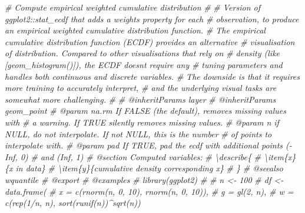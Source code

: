 \documentclass[
]{article}
\newenvironment{Shaded}{\begin{snugshade}}{\end{snugshade}}
\newcommand{\CommentTok}[1]{\textcolor[rgb]{0.56,0.35,0.01}{\textit{#1}}}
\begin{document}
\begin{Shaded}
\begin{Highlighting}[]
\CommentTok{\#\textquotesingle{} Compute empirical weighted cumulative distribution}
\CommentTok{\#\textquotesingle{}}
\CommentTok{\#\textquotesingle{} Version of \textasciigrave{}ggplot2::stat\_ecdf\textasciigrave{} that adds a \textasciigrave{}weights\textasciigrave{} property for each}
\CommentTok{\#\textquotesingle{} observation, to produce an empirical weighted cumulative distribution function.}
\CommentTok{\#\textquotesingle{} The empirical cumulative distribution function (ECDF) provides an alternative}
\CommentTok{\#\textquotesingle{} visualisation of distribution. Compared to other visualisations that rely on}
\CommentTok{\#\textquotesingle{} density (like [geom\_histogram()]), the ECDF doesn\textquotesingle{}t require any}
\CommentTok{\#\textquotesingle{} tuning parameters and handles both continuous and discrete variables.}
\CommentTok{\#\textquotesingle{} The downside is that it requires more training to accurately interpret,}
\CommentTok{\#\textquotesingle{} and the underlying visual tasks are somewhat more challenging.}
\CommentTok{\#\textquotesingle{}}
\CommentTok{\# @inheritParams layer}
\CommentTok{\# @inheritParams geom\_point}
\CommentTok{\#\textquotesingle{} @param na.rm If \textasciigrave{}FALSE\textasciigrave{} (the default), removes missing values with}
\CommentTok{\#\textquotesingle{}    a warning.  If \textasciigrave{}TRUE\textasciigrave{} silently removes missing values.}
\CommentTok{\#\textquotesingle{} @param n if NULL, do not interpolate. If not NULL, this is the number}
\CommentTok{\#\textquotesingle{}   of points to interpolate with.}
\CommentTok{\#\textquotesingle{} @param pad If \textasciigrave{}TRUE\textasciigrave{}, pad the ecdf with additional points ({-}Inf, 0)}
\CommentTok{\#\textquotesingle{}   and (Inf, 1)}
\CommentTok{\#\textquotesingle{} @section Computed variables:}
\CommentTok{\#\textquotesingle{} \textbackslash{}describe\{}
\CommentTok{\#\textquotesingle{}   \textbackslash{}item\{x\}\{x in data\}}
\CommentTok{\#\textquotesingle{}   \textbackslash{}item\{y\}\{cumulative density corresponding x\}}
\CommentTok{\#\textquotesingle{} \}}
\CommentTok{\#\textquotesingle{} @seealso wquantile}
\CommentTok{\#\textquotesingle{} @export}
\CommentTok{\#\textquotesingle{} @examples}
\CommentTok{\#\textquotesingle{} library(ggplot2)}
\CommentTok{\#\textquotesingle{}}
\CommentTok{\#\textquotesingle{} n \textless{}{-} 100}
\CommentTok{\#\textquotesingle{} df \textless{}{-} data.frame(}
\CommentTok{\#\textquotesingle{}   x = c(rnorm(n, 0, 10), rnorm(n, 0, 10)),}
\CommentTok{\#\textquotesingle{}   g = gl(2, n),}
\CommentTok{\#\textquotesingle{}   w = c(rep(1/n, n), sort(runif(n))\^{}sqrt(n))}

\end{Highlighting}
\end{Shaded}
\end{document}
